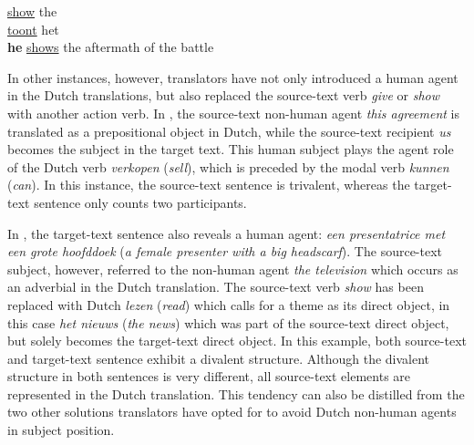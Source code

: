 \documentclass[output=paper]{LSP/langsci}
\begin{document}
\ea \label{ex:5:12}
\ea
{} \ul{show} the \\[1em]
\ex {} \ul{toont} het \\
\textbf{he} \ul{shows} the aftermath of the battle
\z
\z
{}


In other instances, however, translators have not only introduced a human agent in the Dutch translations, but also replaced the source-text verb \textit{give} or \textit{show} with another action verb. In , the source-text non-human agent \textit{this agreement} is translated as a prepositional object in Dutch, while the source-text recipient \textit{us} becomes the subject in the target text. This human subject plays the agent role of the Dutch verb \textit{verkopen} (\textit{sell}), which is preceded by the modal verb \textit{kunnen} (\textit{can}). In this instance, the source-text sentence is trivalent, whereas the target-text sentence only counts two participants. 

In , the target-text sentence also reveals a human agent: \textit{een presentatrice met een grote hoofddoek} (\textit{a female presenter with a big headscarf}). The source-text subject, however, referred to the non-human agent \textit{the television} which occurs as an adverbial in the Dutch translation. The source-text verb \textit{show} has been replaced with Dutch \textit{lezen} (\textit{read}) which calls for a theme as its direct object, in this case \textit{het nieuws} (\textit{the news}) which was part of the source-text direct object, but solely becomes the target-text direct object. In this example, both source-text and target-text sentence exhibit a divalent structure. Although the divalent structure in both sentences is very different, all source-text elements are represented in the Dutch translation. This tendency can also be distilled from the two other solutions translators have opted for to avoid Dutch non-human agents in subject position.             

\end{document}

